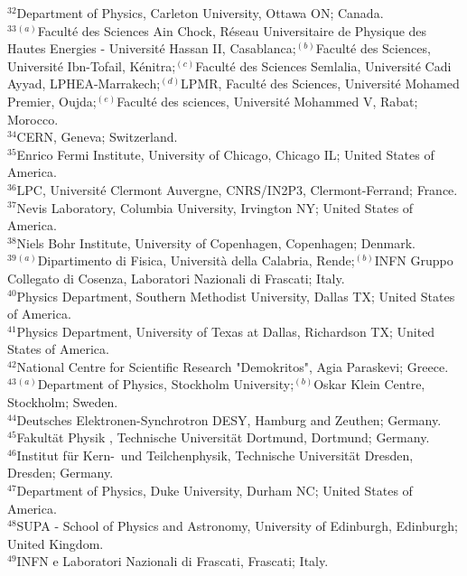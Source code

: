\begin{flushleft}
$^{32}$Department of Physics, Carleton University, Ottawa ON; Canada.\\
$^{33}$$^{(a)}$Facult\'e des Sciences Ain Chock, R\'eseau Universitaire de Physique des Hautes Energies - Universit\'e Hassan II, Casablanca;$^{(b)}$Facult\'{e} des Sciences, Universit\'{e} Ibn-Tofail, K\'{e}nitra;$^{(c)}$Facult\'e des Sciences Semlalia, Universit\'e Cadi Ayyad, LPHEA-Marrakech;$^{(d)}$LPMR, Facult\'e des Sciences, Universit\'e Mohamed Premier, Oujda;$^{(e)}$Facult\'e des sciences, Universit\'e Mohammed V, Rabat; Morocco.\\
$^{34}$CERN, Geneva; Switzerland.\\
$^{35}$Enrico Fermi Institute, University of Chicago, Chicago IL; United States of America.\\
$^{36}$LPC, Universit\'e Clermont Auvergne, CNRS/IN2P3, Clermont-Ferrand; France.\\
$^{37}$Nevis Laboratory, Columbia University, Irvington NY; United States of America.\\
$^{38}$Niels Bohr Institute, University of Copenhagen, Copenhagen; Denmark.\\
$^{39}$$^{(a)}$Dipartimento di Fisica, Universit\`a della Calabria, Rende;$^{(b)}$INFN Gruppo Collegato di Cosenza, Laboratori Nazionali di Frascati; Italy.\\
$^{40}$Physics Department, Southern Methodist University, Dallas TX; United States of America.\\
$^{41}$Physics Department, University of Texas at Dallas, Richardson TX; United States of America.\\
$^{42}$National Centre for Scientific Research "Demokritos", Agia Paraskevi; Greece.\\
$^{43}$$^{(a)}$Department of Physics, Stockholm University;$^{(b)}$Oskar Klein Centre, Stockholm; Sweden.\\
$^{44}$Deutsches Elektronen-Synchrotron DESY, Hamburg and Zeuthen; Germany.\\
$^{45}$Fakult\"{a}t Physik , Technische Universit{\"a}t Dortmund, Dortmund; Germany.\\
$^{46}$Institut f\"{u}r Kern-~und Teilchenphysik, Technische Universit\"{a}t Dresden, Dresden; Germany.\\
$^{47}$Department of Physics, Duke University, Durham NC; United States of America.\\
$^{48}$SUPA - School of Physics and Astronomy, University of Edinburgh, Edinburgh; United Kingdom.\\
$^{49}$INFN e Laboratori Nazionali di Frascati, Frascati; Italy.\\
$$
\end{flushleft}
